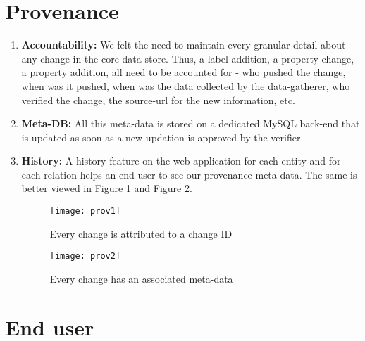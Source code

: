 \section{Provenance}

\begin{enumerate}

\item \textbf{Accountability:} We felt the need to maintain every granular detail about any change in the core data store. Thus, a label addition, a property change, a property addition, all need to be accounted for - who pushed the change, when was it pushed, when was the data collected by the data-gatherer, who verified the change, the source-url for the new information, etc.

\item \textbf{Meta-DB:} All this meta-data is stored on a dedicated MySQL back-end that is updated as soon as a new updation is approved by the verifier. 

\item \textbf{History:} A history feature on the web application for each entity and for each relation helps an end user to see our provenance meta-data. The same is better viewed in Figure \ref{fig:prov1} and Figure \ref{fig:prov2}.

\begin{figure}[H]
\begin{center}  
\texttt{[image: prov1]} 
\caption{Every change is attributed to a change ID}
\label{fig:prov1}
\end{center}
\end{figure}


\begin{figure}[H]
\begin{center}  
\texttt{[image: prov2]} 
\caption{Every change has an associated meta-data}
\label{fig:prov2}
\end{center}
\end{figure}


\end{enumerate}





\section{End user}

